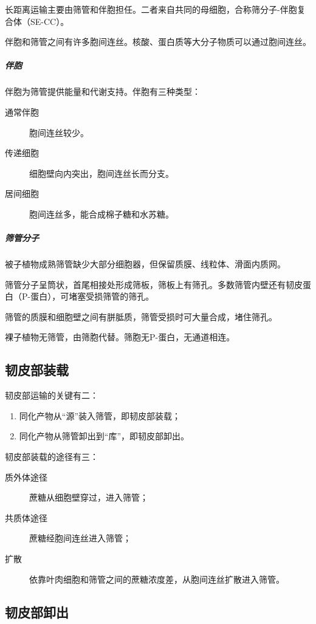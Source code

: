长距离运输主要由筛管和伴胞担任。二者来自共同的母细胞，合称筛分子-伴胞复合体（SE-CC）。

伴胞和筛管之间有许多胞间连丝。核酸、蛋白质等大分子物质可以通过胞间连丝。

\subparagraph{伴胞}

伴胞为筛管提供能量和代谢支持。伴胞有三种类型：

\begin{description}
	\item[通常伴胞] 胞间连丝较少。
	\item[传递细胞] 细胞壁向内突出，胞间连丝长而分支。
	\item[居间细胞] 胞间连丝多，能合成棉子糖和水苏糖。
\end{description}

\subparagraph{筛管分子}

被子植物成熟筛管缺少大部分细胞器，但保留质膜、线粒体、滑面内质网。

筛管分子呈筒状，首尾相接处形成筛板，筛板上有筛孔。多数筛管内壁还有韧皮蛋白（P-蛋白），可堵塞受损筛管的筛孔。

筛管的质膜和细胞壁之间有胼胝质，筛管受损时可大量合成，堵住筛孔。

裸子植物无筛管，由筛胞代替。筛胞无P-蛋白，无通道相连。


\subsection{韧皮部装载}

韧皮部运输的关键有二：
\begin{enumerate}
	\item 同化产物从“源”装入筛管，即韧皮部装载；
	\item 同化产物从筛管卸出到“库”，即韧皮部卸出。
\end{enumerate}

韧皮部装载的途径有三：
\begin{description}
	\item[质外体途径] 蔗糖从细胞壁穿过，进入筛管；
	\item[共质体途径] 蔗糖经胞间连丝进入筛管；
	\item[扩散] 依靠叶肉细胞和筛管之间的蔗糖浓度差，从胞间连丝扩散进入筛管。
\end{description}

\subsection{韧皮部卸出}

